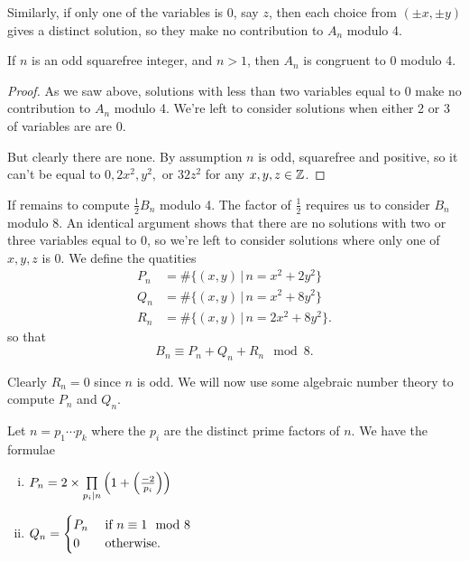 \documentclass[12pt, a4paper]{report}
\begin{document}
Similarly, if only one of the variables is 0, say $z$, then each choice from
$(\pm x, \pm y)$ gives a distinct solution, so they make no contribution
to $A_n$ modulo 4.

\begin{lemma}
  If $n$ is an odd squarefree integer, and $n > 1$,
  then $A_n$ is congruent to 0 modulo 4.
\end{lemma}
\begin{proof}
  As we saw above, solutions with less than two variables equal to 0 make no
  contribution to $A_n$ modulo 4. We're left to consider solutions when
  either 2 or 3 of variables are are 0.

  But clearly there are none. By assumption $n$ is odd, squarefree and
  positive, so it can't be equal to $0, 2x^2, y^2, $ or $32z^2$ for
  any $x,y,z \in {\mathbb Z}$.
\end{proof}

If remains to compute $\frac{1}{2}B_n$ modulo 4. The factor of $\frac{1}{2}$
requires us to consider $B_n$ modulo 8.
An identical argument shows that there are no solutions with two or three
variables
equal to 0, so
we're left to consider solutions where only one of $x,y,z$ is 0.
We define the quatities
\[
  \begin{split}
    P_n &= \#\{(x,y) \,|\, n = x^2 + 2y^2\} \\
    Q_n &= \#\{(x,y) \,|\, n = x^2 + 8y^2\} \\
    R_n &= \#\{(x,y) \,|\, n = 2x^2 + 8y^2\}.
  \end{split}
\]
so that
\[
  B_n \equiv P_n + Q_n + R_n \mod{8}.
\]

Clearly $R_n = 0$ since $n$ is odd. We will now use some algebraic number theory
to compute $P_n$ and $Q_n$.

\begin{thm} \label{coeff_formula}
  Let $n = p_1 \cdots p_k$ where the $p_i$ are the distinct prime factors of
  $n$. We have the formulae
  \begin{enumerate}[(i)]
  \item \(P_n = 2 \times \prod\limits_{p_i \mid n} \left( 1+ \left(\frac{-2}{p_i}\right)
      \right)\)

  \item \( Q_n =
      \begin{cases}
        P_n &\text{ if } n \equiv 1 \mod{8} \\
        0 &\textnormal{ otherwise.}
      \end{cases}
    \)
  \end{enumerate}
\end{thm}
\end{document}

